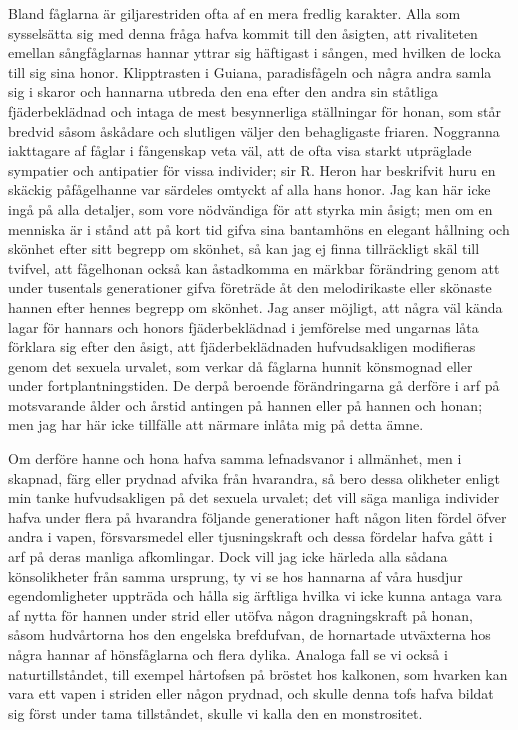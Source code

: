 Bland fåglarna är giljarestriden ofta af en mera fredlig karakter. Alla som sysselsätta sig med denna fråga hafva kommit till den åsigten, att rivaliteten emellan sångfåglarnas hannar yttrar sig häftigast i sången, med hvilken de locka till sig sina honor. Klipptrasten i Guiana, paradisfågeln och några andra samla sig i skaror och hannarna utbreda den ena efter den andra sin ståtliga fjäderbeklädnad och intaga de mest besynnerliga ställningar för honan, som står bredvid såsom åskådare och slutligen väljer den behagligaste friaren. Noggranna iakttagare af fåglar i fångenskap veta väl, att de ofta visa starkt utpräglade sympatier och antipatier för vissa individer; sir R. Heron har beskrifvit huru en skäckig påfågelhanne var särdeles omtyckt af alla hans honor. Jag kan här icke ingå på alla detaljer, som vore nödvändiga för att styrka min åsigt; men om en menniska är i stånd att på kort tid gifva sina bantamhöns en elegant hållning och skönhet efter sitt begrepp om skönhet, så kan jag ej finna tillräckligt skäl till tvifvel, att fågelhonan också kan åstadkomma en märkbar förändring genom att under tusentals generationer gifva företräde åt den melodirikaste eller skönaste hannen efter hennes begrepp om skönhet. Jag anser möjligt, att några väl kända lagar för hannars och honors fjäderbeklädnad i jemförelse med ungarnas låta förklara sig efter den åsigt, att fjäderbeklädnaden hufvudsakligen modifieras genom det sexuela urvalet, som verkar då fåglarna hunnit könsmognad eller under fortplantningstiden. De derpå beroende förändringarna gå derföre i arf på motsvarande ålder och årstid antingen på hannen eller på hannen och honan; men jag har här icke tillfälle att närmare inlåta mig på detta ämne.

Om derföre hanne och hona hafva samma lefnadsvanor i allmänhet, men i skapnad, färg eller prydnad afvika från hvarandra, så bero dessa olikheter enligt min tanke hufvudsakligen på det sexuela urvalet; det vill säga manliga individer hafva under flera på hvarandra följande generationer haft någon liten fördel öfver andra i vapen, försvarsmedel eller tjusningskraft och dessa fördelar hafva gått i arf på deras manliga afkomlingar. Dock vill jag icke härleda alla sådana könsolikheter från samma ursprung, ty vi se hos hannarna af våra husdjur egendomligheter uppträda och hålla sig ärftliga hvilka vi icke kunna antaga vara af nytta för hannen under strid eller utöfva någon dragningskraft på honan, såsom hudvårtorna hos den engelska brefdufvan, de hornartade utväxterna hos några hannar af hönsfåglarna och flera dylika. Analoga fall se vi också i naturtillståndet, till exempel hårtofsen på bröstet hos kalkonen, som hvarken kan vara ett vapen i striden eller någon prydnad, och skulle denna tofs hafva bildat sig först under tama tillståndet, skulle vi kalla den en monstrositet.



